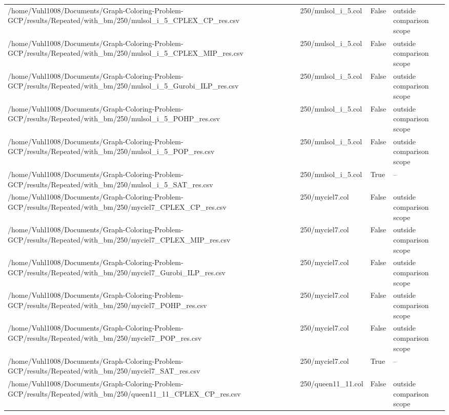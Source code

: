 \begin{table}[htbp]
\begin{tabular}{llll}
/home/Vuhl1008/Documents/Graph-Coloring-Problem-GCP/results/Repeated/with\_bm/250/mulsol\_i\_5\_CPLEX\_CP\_res.csv & 250/mulsol\_i\_5.col & False & outside comparison scope \\
/home/Vuhl1008/Documents/Graph-Coloring-Problem-GCP/results/Repeated/with\_bm/250/mulsol\_i\_5\_CPLEX\_MIP\_res.csv & 250/mulsol\_i\_5.col & False & outside comparison scope \\
/home/Vuhl1008/Documents/Graph-Coloring-Problem-GCP/results/Repeated/with\_bm/250/mulsol\_i\_5\_Gurobi\_ILP\_res.csv & 250/mulsol\_i\_5.col & False & outside comparison scope \\
/home/Vuhl1008/Documents/Graph-Coloring-Problem-GCP/results/Repeated/with\_bm/250/mulsol\_i\_5\_POHP\_res.csv & 250/mulsol\_i\_5.col & False & outside comparison scope \\
/home/Vuhl1008/Documents/Graph-Coloring-Problem-GCP/results/Repeated/with\_bm/250/mulsol\_i\_5\_POP\_res.csv & 250/mulsol\_i\_5.col & False & outside comparison scope \\
/home/Vuhl1008/Documents/Graph-Coloring-Problem-GCP/results/Repeated/with\_bm/250/mulsol\_i\_5\_SAT\_res.csv & 250/mulsol\_i\_5.col & True & -- \\
/home/Vuhl1008/Documents/Graph-Coloring-Problem-GCP/results/Repeated/with\_bm/250/myciel7\_CPLEX\_CP\_res.csv & 250/myciel7.col & False & outside comparison scope \\
/home/Vuhl1008/Documents/Graph-Coloring-Problem-GCP/results/Repeated/with\_bm/250/myciel7\_CPLEX\_MIP\_res.csv & 250/myciel7.col & False & outside comparison scope \\
/home/Vuhl1008/Documents/Graph-Coloring-Problem-GCP/results/Repeated/with\_bm/250/myciel7\_Gurobi\_ILP\_res.csv & 250/myciel7.col & False & outside comparison scope \\
/home/Vuhl1008/Documents/Graph-Coloring-Problem-GCP/results/Repeated/with\_bm/250/myciel7\_POHP\_res.csv & 250/myciel7.col & False & outside comparison scope \\
/home/Vuhl1008/Documents/Graph-Coloring-Problem-GCP/results/Repeated/with\_bm/250/myciel7\_POP\_res.csv & 250/myciel7.col & False & outside comparison scope \\
/home/Vuhl1008/Documents/Graph-Coloring-Problem-GCP/results/Repeated/with\_bm/250/myciel7\_SAT\_res.csv & 250/myciel7.col & True & -- \\
/home/Vuhl1008/Documents/Graph-Coloring-Problem-GCP/results/Repeated/with\_bm/250/queen11\_11\_CPLEX\_CP\_res.csv & 250/queen11\_11.col & False & outside comparison scope \\

\end{tabular}
\end{table}
